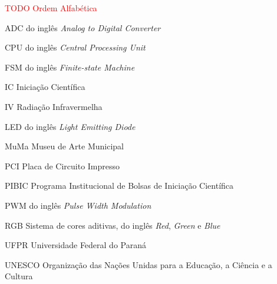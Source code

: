 \begin{siglas}
    \item[\textcolor{red}{TODO}]\textcolor{red}{Ordem Alfabética}
    \item[ADC] do inglês \emph{Analog to Digital Converter}
    \item[CPU] do inglês \emph{Central Processing Unit}
    \item[FSM] do inglês \emph{Finite-state Machine}
    \item[IC] Iniciação Científica
    \item[IV] Radiação Infravermelha
    \item[LED] do inglês \emph{Light Emitting Diode}
    \item[MuMa] Museu de Arte Municipal
    \item[PCI] Placa de Circuito Impresso
    \item[PIBIC] Programa Institucional de Bolsas de Iniciação Científica
    \item[PWM] do inglês \emph{Pulse Width Modulation}
    \item[RGB] Sistema de cores aditivas, do inglês \emph{Red}, \emph{Green} e \emph{Blue}
    \item[UFPR] Universidade Federal do Paraná
    \item[UNESCO] Organização das Nações Unidas para a Educação, a Ciência e a Cultura
\end{siglas}

